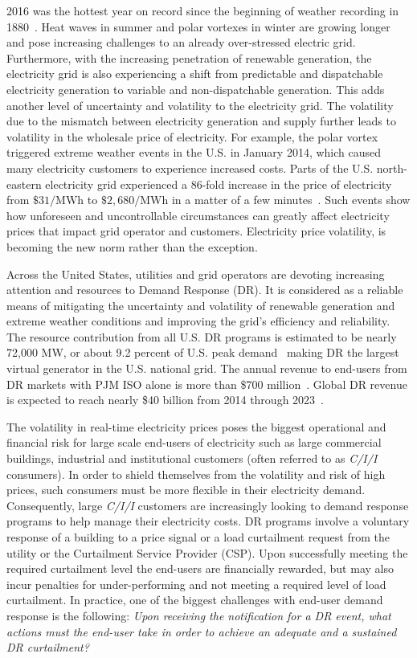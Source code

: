2016 was the hottest year on record since the beginning of weather recording in 1880~\cite{noaa}. Heat waves in summer and polar vortexes in winter are growing longer and pose increasing challenges to an already over-stressed electric grid. Furthermore, with the increasing penetration of renewable generation, the electricity grid is also experiencing a shift from predictable and dispatchable electricity generation to variable and non-dispatchable generation. This adds another level of uncertainty and volatility to the electricity grid. The volatility due to the mismatch between electricity generation and supply further leads to volatility in the wholesale price of electricity. For example, the polar vortex triggered extreme weather events in the U.S. in January 2014, which caused many electricity customers to experience increased costs. Parts of the U.S. north-eastern electricity grid experienced a 86-fold increase in the price of electricity from $\$31/\si{\mega\watt\hour}$ to $\$2,680/\si{\mega\watt\hour}$ in a matter of a few minutes~\cite{volatility}.  Such events show how unforeseen and uncontrollable circumstances can greatly affect electricity prices that impact grid operator and customers. Electricity price volatility, is becoming the new norm rather than the exception.

Across the United States, utilities and grid operators are devoting increasing attention and resources to Demand Response (DR). It is considered as a reliable means of mitigating the uncertainty and volatility of renewable generation and extreme weather conditions and improving the grid's efficiency and reliability. The resource contribution from all U.S. DR programs is estimated to be nearly 72,000 MW, or about 9.2 percent of U.S. peak demand~\cite{federal2008assessment} making DR the largest virtual generator in the U.S. national grid. The annual revenue to end-users from DR markets with PJM ISO alone is more than \$700 million~\cite{pjm}. Global DR revenue is expected to reach nearly \$40 billion from 2014 through 2023~\cite{navigant}.

The volatility in real-time electricity prices poses the biggest operational and financial risk for large scale end-users of electricity such as large commercial buildings, industrial and institutional customers (often referred to as \textit{C/I/I} consumers). In order to shield themselves from the volatility and risk of high prices, such consumers must be more flexible in their electricity demand. Consequently, large \textit{C/I/I} customers are increasingly looking to demand response programs to help manage their electricity costs. DR programs involve a voluntary response of a building to a price signal or a load curtailment request from the utility or the Curtailment Service Provider (CSP). Upon successfully meeting the required curtailment level the end-users are financially rewarded, but may also incur penalties for under-performing and not meeting a required level of load curtailment. In practice, one of the biggest challenges with end-user demand response is the following: \emph{Upon receiving the notification for a DR event, what actions must the end-user take in order to achieve an adequate and a sustained DR curtailment?} 

